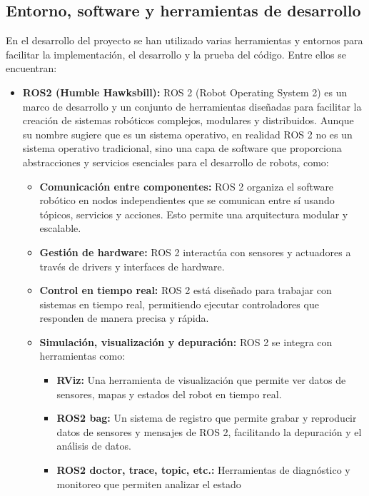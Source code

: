 \documentclass[12pt, a4paper, twoside]{article}
\begin{document}
\subsection{Entorno, software y herramientas de desarrollo}
  En el desarrollo del proyecto se han utilizado varias herramientas y entornos para facilitar la implementación, el desarrollo
  y la prueba del código. Entre ellos se encuentran:
  \begin{itemize}
    \item
      \textbf{ROS2\cite{doi:10.1126/scirobotics.abm6074} (Humble Hawksbill):} ROS 2 (Robot Operating System 2) es un marco de desarrollo y un conjunto de herramientas 
      diseñadas para facilitar la creación de sistemas robóticos complejos, modulares y distribuidos. Aunque su nombre sugiere que es 
      un sistema operativo, en realidad ROS 2 no es un sistema operativo tradicional, sino una capa de software que proporciona 
      abstracciones y servicios esenciales para el desarrollo de robots, como:
      \begin{itemize}
        \item \textbf{Comunicación entre componentes:} ROS 2 organiza el software robótico en nodos independientes que se comunican 
        entre sí usando tópicos, servicios y acciones. Esto permite una arquitectura modular y escalable.
        \item \textbf{Gestión de hardware:} ROS 2 interactúa con sensores y actuadores a través de drivers y interfaces de hardware.
        \item \textbf{Control en tiempo real:} ROS 2 está diseñado para trabajar con sistemas en tiempo real, permitiendo ejecutar 
        controladores que responden de manera precisa y rápida. 
        \item \textbf{Simulación, visualización y depuración:} ROS 2 se integra con herramientas como:
        \begin{itemize}
        \item \textbf{RViz:} Una herramienta de visualización que permite ver datos de sensores, mapas y estados del robot en 
        tiempo real.
        \item \textbf{ROS2\cite{doi:10.1126/scirobotics.abm6074} bag:} Un sistema de registro que permite grabar y reproducir datos de sensores y mensajes de ROS 2, 
        facilitando la depuración y el análisis de datos.
        \item \textbf{ROS2\cite{doi:10.1126/scirobotics.abm6074} doctor, trace, topic, etc.:} Herramientas de diagnóstico y monitoreo que permiten analizar el estado 

\end{itemize}
\end{itemize}
\end{itemize}
\end{document}
